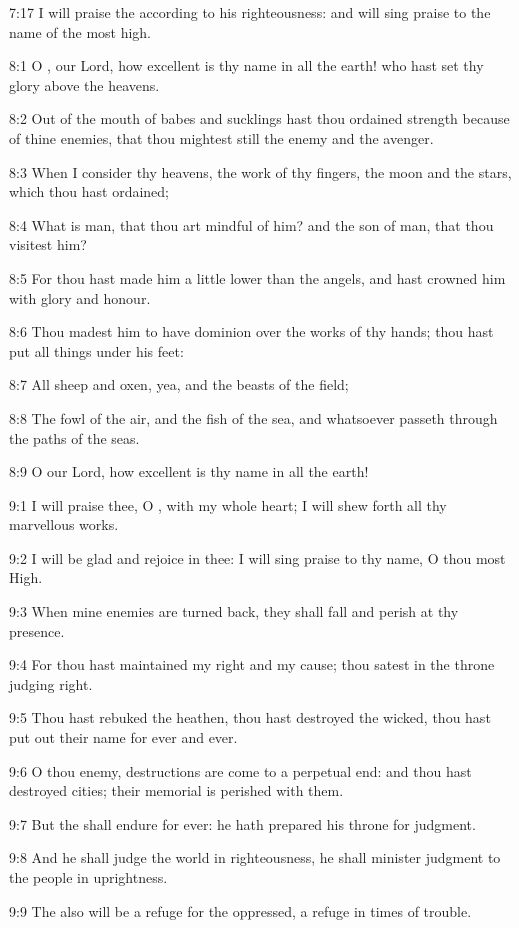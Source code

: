 7:17 I will praise the \LORD according to his righteousness: and will sing praise to the name of the \LORD most high.



8:1 O \LORD, our Lord, how excellent is thy name in all the earth! who hast set thy glory above the heavens.

8:2 Out of the mouth of babes and sucklings hast thou ordained strength because of thine enemies, that thou mightest still the enemy and the avenger.

8:3 When I consider thy heavens, the work of thy fingers, the moon and the stars, which thou hast ordained;

8:4 What is man, that thou art mindful of him? and the son of man, that thou visitest him?

8:5 For thou hast made him a little lower than the angels, and hast crowned him with glory and honour.

8:6 Thou madest him to have dominion over the works of thy hands; thou hast put all things under his feet:

8:7 All sheep and oxen, yea, and the beasts of the field;

8:8 The fowl of the air, and the fish of the sea, and whatsoever passeth through the paths of the seas.

8:9 O \LORD our Lord, how excellent is thy name in all the earth!


9:1 I will praise thee, O \LORD, with my whole heart; I will shew forth all thy marvellous works.

9:2 I will be glad and rejoice in thee: I will sing praise to thy name, O thou most High.

9:3 When mine enemies are turned back, they shall fall and perish at thy presence.

9:4 For thou hast maintained my right and my cause; thou satest in the throne judging right.

9:5 Thou hast rebuked the heathen, thou hast destroyed the wicked, thou hast put out their name for ever and ever.

9:6 O thou enemy, destructions are come to a perpetual end: and thou hast destroyed cities; their memorial is perished with them.

9:7 But the \LORD shall endure for ever: he hath prepared his throne for judgment.

9:8 And he shall judge the world in righteousness, he shall minister judgment to the people in uprightness.

9:9 The \LORD also will be a refuge for the oppressed, a refuge in times of trouble.

